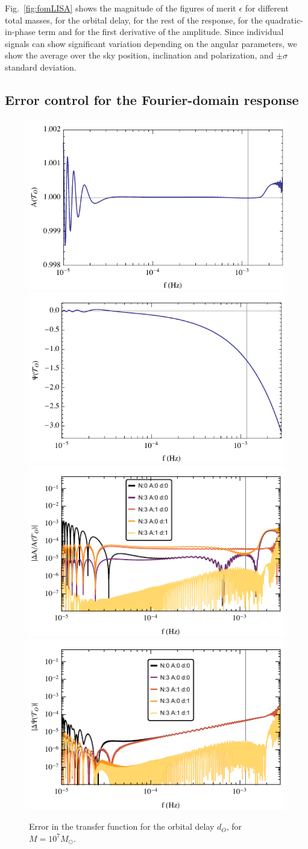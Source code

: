\documentclass[aps,showpacs,%
prd,superscriptaddress,nofootinbib]{revtex4}
\newcommand{\Msol}{M_{\odot}}
\begin{document}
Fig.~\ref{fig:fomLISA} shows the magnitude of the figures of merit $\epsilon$ for different total masses, for the orbital delay, for the rest of the response, for the quadratic-in-phase term and for the first derivative of the amplitude. Since individual signals can show significant variation depending on the angular parameters, we show the average over the sky position, inclination and polarization, and $\pm \sigma$ standard deviation.


\subsection{Error control for the Fourier-domain response}
\label{subsec:errorsLISA}

\begin{figure}
  \centering
  \includegraphics[width=.48\linewidth]{plots/LISAtransferM1e7dOamp.pdf}
  \hspace{0.2cm}
  \includegraphics[width=.48\linewidth]{plots/LISAtransferM1e7dOphase.pdf}
  \includegraphics[width=.48\linewidth]{plots/LISAerrorM1e7dOamp.pdf}
  \hspace{0.2cm}
  \includegraphics[width=.48\linewidth]{plots/LISAerrorM1e7dOphase.pdf}
  \caption{Error in the transfer function for the orbital delay $d_{O}$, for $M=10^{7} \Msol$.}
  \label{fig:prectoymodel}
\end{figure}
\end{document}
